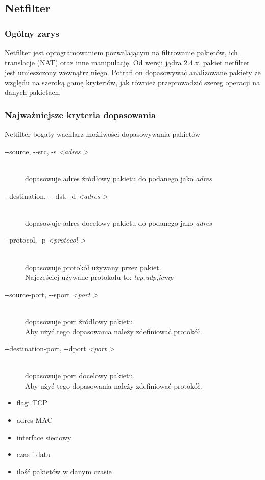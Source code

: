 \documentclass[a4paper,10pt]{book}
\begin{document}
		\subsection{Netfilter}
			\subsubsection{Ogólny zarys}
				Netfilter jest oprogramowaniem pozwalającym na filtrowanie pakietów, ich translacje (NAT) oraz inne manipulację.
				Od wersji jądra 2.4.x, pakiet netfilter jest umieszczony wewnątrz niego.
				Potrafi on dopasowywać analizowane pakiety ze względu na szeroką gamę kryteriów, jak również przeprowadzić szereg operacji na danych pakietach.
			\subsubsection{Najważniejsze kryteria dopasowania}
				Netfilter bogaty wachlarz możliwości dopasowywania pakietów
				\begin{description}
					\item[-{}-source, -{}-src, -s \textit{\textless adres \textgreater} ] \hfill \\
						dopasowuje adres źródłowy pakietu do podanego jako \textit{adres}
					\item[-{}-destination, -{}- dst, -d \textit{\textless adres \textgreater}] \hfill\\
						dopasowuje adres docelowy pakietu do podanego jako \textit{adres}
					\item[-{}-protocol, -p \textit{\textless protocol \textgreater}] \hfill \\
						dopasowuje protokół używany przez pakiet.\\
						Najczęściej używane protokołu to: \textit{tcp},\textit{udp},\textit{icmp}
					\item[-{}-source-port, -{}-sport \textit{\textless port \textgreater} ]\hfill\\
						dopasowuje port źródłowy pakietu.\\
						Aby użyć tego dopasowania należy zdefiniować protokół.
					\item[-{}-destination-port, -{}-dport \textit{\textless port \textgreater}] \hfill \\
						dopasowuje port docelowy pakietu.\\
						Aby użyć tego dopasowania należy zdefiniować protokół.
				\end{description}
				\begin{itemize}
					\item flagi TCP
					\item adres MAC
					\item interface sieciowy
					\item czas i data
					\item ilość pakietów w danym czasie
				\end{itemize}
\end{document}
